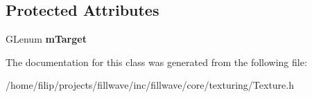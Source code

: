 \subsection*{Protected Attributes}
\begin{DoxyCompactItemize}
\item 
\mbox{\label{classflw_1_1flc_1_1Texture_a62572043b6ab94c55e022cc122825de1}} 
G\+Lenum {\bfseries m\+Target}
\end{DoxyCompactItemize}


The documentation for this class was generated from the following file\+:\begin{DoxyCompactItemize}
\item 
/home/filip/projects/fillwave/inc/fillwave/core/texturing/Texture.\+h\end{DoxyCompactItemize}
